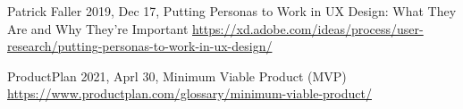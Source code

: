 \begin{thebibliography}{9} 
    Patrick Faller
    2019, Dec 17,
    Putting Personas to Work in UX Design: What They Are and Why They’re Important
    \url{https://xd.adobe.com/ideas/process/user-research/putting-personas-to-work-in-ux-design/}

    ProductPlan
    2021, Aprl 30,
    Minimum Viable Product (MVP)
    \url{https://www.productplan.com/glossary/minimum-viable-product/}
\end{thebibliography}

